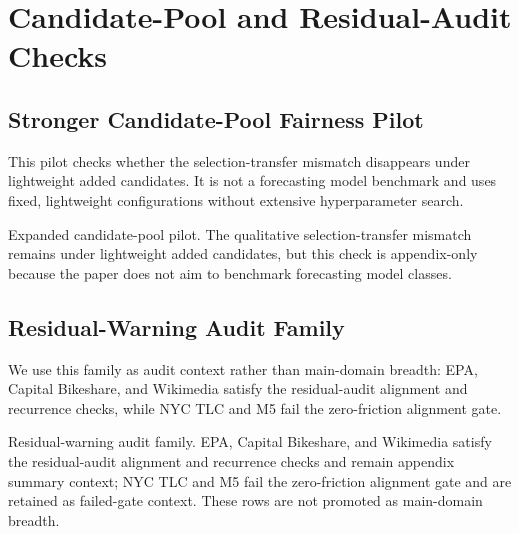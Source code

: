 \documentclass{article}
\begin{document}
\FloatBarrier

\section{Candidate-Pool and Residual-Audit Checks}
\label{app:candidate-residual-checks}

\subsection{Stronger Candidate-Pool Fairness Pilot}
\label{app:stronger-pool-pilot}

This pilot checks whether the selection-transfer mismatch disappears under lightweight added candidates. It is not a forecasting model benchmark and uses fixed, lightweight configurations without extensive hyperparameter search.

\begin{table}[!htbp]
\centering
\begin{minipage}{\appmidtablewidth}
\centering
\scriptsize
\setlength{\tabcolsep}{2.5pt}
\begin{adjustbox}{width=\linewidth}

\end{adjustbox}
\caption{Expanded candidate-pool pilot. The qualitative selection-transfer mismatch remains under lightweight added candidates, but this check is appendix-only because the paper does not aim to benchmark forecasting model classes.}
\label{tab:stronger-pool-pilot}
\end{minipage}
\end{table}

\subsection{Residual-Warning Audit Family}
\label{app:residual-audit}

We use this family as audit context rather than main-domain breadth: EPA, Capital Bikeshare, and Wikimedia satisfy the residual-audit alignment and recurrence checks, while NYC TLC and M5 fail the zero-friction alignment gate.

\begin{table}[!htbp]
\centering
\begin{minipage}{\appmidtablewidth}
\centering
\scriptsize
\setlength{\tabcolsep}{2.5pt}
\begin{adjustbox}{width=\linewidth}

\end{adjustbox}
\caption{Residual-warning audit family. EPA, Capital Bikeshare, and Wikimedia satisfy the residual-audit alignment and recurrence checks and remain appendix summary context; NYC TLC and M5 fail the zero-friction alignment gate and are retained as failed-gate context. These rows are not promoted as main-domain breadth.}
\label{tab:residual-candidate-audit}
\end{minipage}
\end{table}
\end{document}
